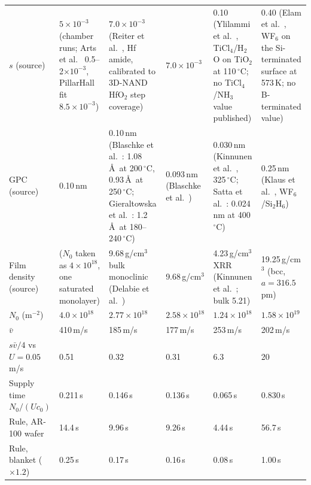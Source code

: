 \documentclass[11pt,letterpaper]{article}
\newcommand{\degC}{$^{\circ}$C}
\begin{document}
\begin{table}[tbp]
\begin{tabular}{P{1.0in}P{0.92in}P{0.92in}P{0.92in}P{0.92in}P{0.92in}}
$s$ (source) & $5\times10^{-3}$ (chamber runs; Arts et al.\ \cite{arts2019jvsta} 0.5--2$\times10^{-3}$, PillarHall fit $8.5\times10^{-3}$) & $7.0\times10^{-3}$ (Reiter et al.\ \cite{reiter2024}, Hf amide, calibrated to 3D-NAND HfO$_2$ step coverage) & $7.0\times10^{-3}$ & 0.10 (Ylilammi et al.\ \cite{ylilammi2018}, TiCl$_4$/H$_2$O on TiO$_2$ at 110\,\degC; no TiCl$_4$/NH$_3$ value published) & 0.40 (Elam et al.\ \cite{elam2001}, WF$_6$ on the Si-terminated surface at 573\,K; no B-terminated value) \\
GPC (source) & 0.10\,nm & 0.10\,nm (Blaschke et al.\ \cite{blaschke2020}: 1.08\,\AA\ at 200\,\degC, 0.93\,\AA\ at 250\,\degC; Gieraltowska et al.\ \cite{gieraltowska2023}: 1.2\,\AA\ at 180--240\,\degC) & 0.093\,nm (Blaschke et al.\ \cite{blaschke2020}) & 0.030\,nm (Kinnunen et al.\ \cite{kinnunen2017}, 325\,\degC; Satta et al.\ \cite{satta2002}: 0.024\,nm at 400\,\degC) & 0.25\,nm (Klaus et al.\ \cite{klaus2000}, WF$_6$/Si$_2$H$_6$) \\
Film density (source) & ($N_0$ taken as $4\times10^{18}$, one saturated monolayer) & 9.68\,g/cm$^3$ bulk monoclinic (Delabie et al.\ \cite{delabie2005}) & 9.68\,g/cm$^3$ & 4.23\,g/cm$^3$ XRR (Kinnunen et al.\ \cite{kinnunen2017}; bulk 5.21) & 19.25\,g/cm$^3$ (bcc, $a = 316.5$\,pm) \\
$N_0$ (m$^{-2}$) & $4.0\times10^{18}$ & $2.77\times10^{18}$ & $2.58\times10^{18}$ & $1.24\times10^{18}$ & $1.58\times10^{19}$ \\
$\bar{v}$ & 410\,m/s & 185\,m/s & 177\,m/s & 253\,m/s & 202\,m/s \\
$s\bar{v}/4$ vs $U = 0.05$\,m/s & 0.51 & 0.32 & 0.31 & 6.3 & 20 \\
Supply time $N_0/(U c_0)$ & 0.211\,s & 0.146\,s & 0.136\,s & 0.065\,s & 0.830\,s \\
Rule, AR-100 wafer & 14.4\,s & 9.96\,s & 9.26\,s & 4.44\,s & 56.7\,s \\
Rule, blanket ($\times 1.2$) & 0.25\,s & 0.17\,s & 0.16\,s & 0.08\,s & 1.00\,s \\
\bottomrule
\end{tabular}
\end{table}
\end{document}
